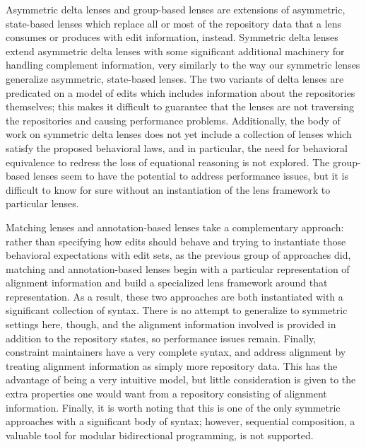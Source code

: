 Asymmetric delta lenses and group-based lenses are extensions of asymmetric,
state-based lenses which replace all or most of the repository data that a
lens consumes or produces with edit information, instead. Symmetric delta
lenses extend asymmetric delta lenses with some significant additional
machinery for handling complement information, very similarly to the way our
symmetric lenses generalize asymmetric, state-based lenses. The two variants
of delta lenses are predicated on a model of edits which includes
information about the repositories themselves; this makes it difficult to
guarantee that the lenses are not traversing the repositories and causing
performance problems. Additionally, the body of work on symmetric delta
lenses does not yet include a collection of lenses which satisfy the
proposed behavioral laws, and in particular, the need for behavioral
equivalence to redress the loss of equational reasoning is not explored. The
group-based lenses seem to have the potential to address performance issues,
but it is difficult to know for sure without an instantiation of the lens
framework to particular lenses.

Matching lenses and annotation-based lenses take a complementary approach:
rather than specifying how edits should behave and trying to instantiate
those behavioral expectations with edit sets, as the previous group of
approaches did, matching and annotation-based lenses begin with a particular
representation of alignment information and build a specialized lens
framework around that representation. As a result, these two approaches are
both instantiated with a significant collection of syntax. There is no
attempt to generalize to symmetric settings here, though, and the alignment
information involved is provided in addition to the repository states, so
performance issues remain. Finally, constraint maintainers have a very
complete syntax, and address alignment by treating alignment information as
simply more repository data. This has the advantage of being a very
intuitive model, but little consideration is given to the extra properties
one would want from a repository consisting of alignment information.
Finally, it is worth noting that this is one of the only symmetric
approaches with a significant body of syntax; however, sequential
composition, a valuable tool for modular bidirectional programming, is not
supported.

